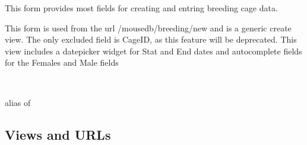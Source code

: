 \documentclass[letterpaper,10pt,english]{sphinxmanual}
\begin{document}
\begin{fulllineitems}
\label{api:animal.forms.BreedingForm}
This form provides most fields for creating and entring breeding cage data.

This form is used from the url /mousedb/breeding/new and is a generic create view.  The only excluded field is CageID, as this feature will be deprecated.  This view includes a datepicker widget for Stat and End dates and autocomplete fields for the Females and Male fields

\begin{fulllineitems}
\label{api:animal.forms.BreedingForm.Media}
\end{fulllineitems}


\begin{fulllineitems}
\label{api:animal.forms.BreedingForm.Meta}~

\begin{fulllineitems}
\label{api:animal.forms.BreedingForm.Meta.model}
alias of 

\end{fulllineitems}


\end{fulllineitems}


\begin{fulllineitems}
\label{api:animal.forms.BreedingForm.media}
\end{fulllineitems}


\end{fulllineitems}



\subsection{Views and URLs}
\label{api:id3}\label{api:module-animal.urls}
\end{document}
